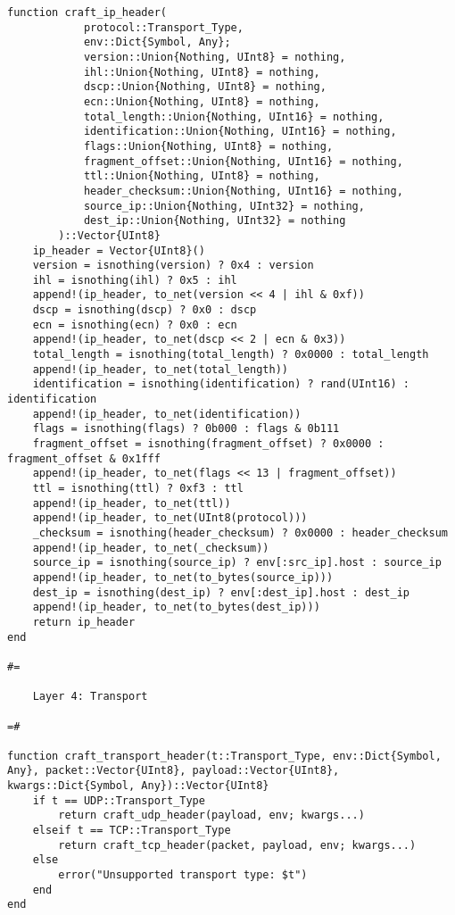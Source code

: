 \begin{lstlisting}[language=JuliaLocal, style=julia]
function craft_ip_header(
            protocol::Transport_Type,
            env::Dict{Symbol, Any};
            version::Union{Nothing, UInt8} = nothing,
            ihl::Union{Nothing, UInt8} = nothing,
            dscp::Union{Nothing, UInt8} = nothing,
            ecn::Union{Nothing, UInt8} = nothing,
            total_length::Union{Nothing, UInt16} = nothing,
            identification::Union{Nothing, UInt16} = nothing,
            flags::Union{Nothing, UInt8} = nothing,
            fragment_offset::Union{Nothing, UInt16} = nothing,
            ttl::Union{Nothing, UInt8} = nothing,
            header_checksum::Union{Nothing, UInt16} = nothing,
            source_ip::Union{Nothing, UInt32} = nothing,
            dest_ip::Union{Nothing, UInt32} = nothing
        )::Vector{UInt8}
    ip_header = Vector{UInt8}()
    version = isnothing(version) ? 0x4 : version
    ihl = isnothing(ihl) ? 0x5 : ihl
    append!(ip_header, to_net(version << 4 | ihl & 0xf))
    dscp = isnothing(dscp) ? 0x0 : dscp
    ecn = isnothing(ecn) ? 0x0 : ecn
    append!(ip_header, to_net(dscp << 2 | ecn & 0x3))
    total_length = isnothing(total_length) ? 0x0000 : total_length
    append!(ip_header, to_net(total_length))
    identification = isnothing(identification) ? rand(UInt16) : identification
    append!(ip_header, to_net(identification))
    flags = isnothing(flags) ? 0b000 : flags & 0b111
    fragment_offset = isnothing(fragment_offset) ? 0x0000 : fragment_offset & 0x1fff
    append!(ip_header, to_net(flags << 13 | fragment_offset))
    ttl = isnothing(ttl) ? 0xf3 : ttl
    append!(ip_header, to_net(ttl))
    append!(ip_header, to_net(UInt8(protocol)))
    _checksum = isnothing(header_checksum) ? 0x0000 : header_checksum
    append!(ip_header, to_net(_checksum))
    source_ip = isnothing(source_ip) ? env[:src_ip].host : source_ip
    append!(ip_header, to_net(to_bytes(source_ip)))
    dest_ip = isnothing(dest_ip) ? env[:dest_ip].host : dest_ip
    append!(ip_header, to_net(to_bytes(dest_ip)))
    return ip_header
end

#=

    Layer 4: Transport

=#

function craft_transport_header(t::Transport_Type, env::Dict{Symbol, Any}, packet::Vector{UInt8}, payload::Vector{UInt8}, kwargs::Dict{Symbol, Any})::Vector{UInt8}
    if t == UDP::Transport_Type
        return craft_udp_header(payload, env; kwargs...)
    elseif t == TCP::Transport_Type
        return craft_tcp_header(packet, payload, env; kwargs...)
    else
        error("Unsupported transport type: $t")
    end
end


\end{lstlisting}
